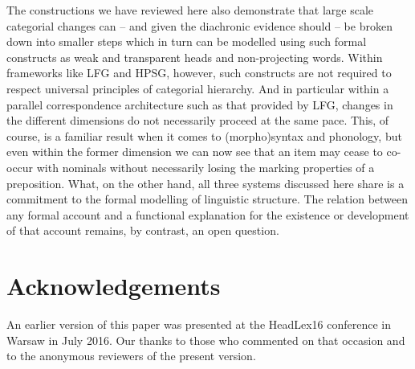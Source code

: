 \documentclass[output=paper]{langsci/langscibook}
\begin{document}
The constructions we have reviewed here also demonstrate that large scale
categorial changes can -- and given the diachronic evidence should -- be
broken down into smaller steps which in turn can be modelled using such formal
constructs as weak and transparent heads and non-projecting words. Within
frameworks like \gls{LFG} and \gls{HPSG}, however, such constructs are not
required to respect universal principles of categorial hierarchy. And in
particular within a parallel correspondence architecture such as that provided
by \gls{LFG}, changes in the different dimensions do not necessarily proceed at
the same pace. This, of course, is a familiar result when it comes to
(morpho)syntax and phonology, but even within the former dimension we can now
see that an item may cease to co-occur with nominals without necessarily losing
the marking properties of a preposition. What, on the other hand, all three
systems discussed here share is a commitment to the formal modelling of
linguistic structure. The relation between any formal account and a functional
explanation for the existence or development of that account remains, by
contrast, an open question.

\printchapterglossary{}

\section*{Acknowledgements}

An earlier version of this paper was presented at the HeadLex16 conference in
Warsaw in July 2016. Our thanks to those who commented on that occasion and to
the anonymous reviewers of the present version.

{\sloppy
\printbibliography[heading=subbibliography,notkeyword=this]
}
\end{document}
